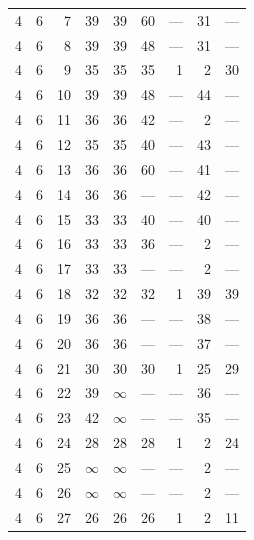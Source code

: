 \begin{longtable}{rrrrrrrrl}
4 & 6 & 7 & 39 & 39 & 60 & --- & 31 & --- \\
4 & 6 & 8 & 39 & 39 & 48 & --- & 31 & --- \\
4 & 6 & 9 & 35 & 35 & 35 & 1 & 2 & 30 \\
4 & 6 & 10 & 39 & 39 & 48 & --- & 44 & --- \\
4 & 6 & 11 & 36 & 36 & 42 & --- & 2 & --- \\
4 & 6 & 12 & 35 & 35 & 40 & --- & 43 & --- \\
4 & 6 & 13 & 36 & 36 & 60 & --- & 41 & --- \\
4 & 6 & 14 & 36 & 36 & --- & --- & 42 & --- \\
4 & 6 & 15 & 33 & 33 & 40 & --- & 40 & --- \\
4 & 6 & 16 & 33 & 33 & 36 & --- & 2 & --- \\
4 & 6 & 17 & 33 & 33 & --- & --- & 2 & --- \\
4 & 6 & 18 & 32 & 32 & 32 & 1 & 39 & 39 \\
4 & 6 & 19 & 36 & 36 & --- & --- & 38 & --- \\
4 & 6 & 20 & 36 & 36 & --- & --- & 37 & --- \\
4 & 6 & 21 & 30 & 30 & 30 & 1 & 25 & 29 \\
4 & 6 & 22 & 39 & $\infty$ & --- & --- & 36 & --- \\
4 & 6 & 23 & 42 & $\infty$ & --- & --- & 35 & --- \\
4 & 6 & 24 & 28 & 28 & 28 & 1 & 2 & 24 \\
4 & 6 & 25 & $\infty$ & $\infty$ & --- & --- & 2 & --- \\
4 & 6 & 26 & $\infty$ & $\infty$ & --- & --- & 2 & --- \\
4 & 6 & 27 & 26 & 26 & 26 & 1 & 2 & 11 \\
\bottomrule\end{longtable}

